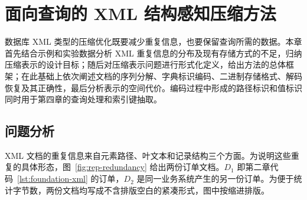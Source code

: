 \chapter{面向查询的 XML 结构感知压缩方法}
\label{chap:representation}

数据库 XML 类型的压缩优化既要减少重复信息，也要保留查询所需的数据。本章首先结合示例和实验数据分析 XML 重复信息的分布及现有存储方式的不足，归纳压缩表示的设计目标；随后对压缩表示问题进行形式化定义，给出方法的总体框架；在此基础上依次阐述文档的序列分解、字典标识编码、二进制存储格式、解码恢复及其正确性，最后分析表示的空间代价。编码过程中形成的路径标识和值标识同时用于第四章的查询处理和索引键抽取。

\LinesNumbered
\SetAlgoNoEnd
{}

\section{问题分析}
\label{sec:rep-analysis}

XML 文档的重复信息来自元素路径、叶文本和记录结构三个方面。为说明这些重复的具体形态，图~\ref{fig:rep-redundancy} 给出两份订单文档。$D_1$ 即第二章代码~\ref{lst:foundation-xml} 的订单，$D_2$ 是同一业务系统产生的另一份订单。为便于统计字节数，两份文档均写成不含排版空白的紧凑形式，图中按缩进排版。

